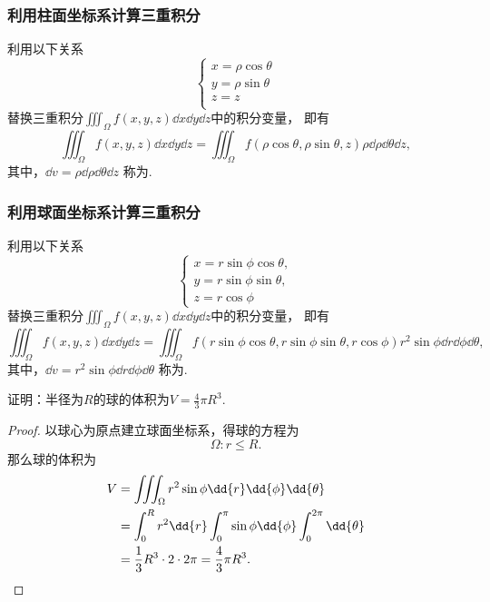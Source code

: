\subsubsection{利用柱面坐标系计算三重积分}
利用以下关系\begin{equation*}
	\left\{ \begin{array}{l}
		x = \rho\cos\theta \\
		y = \rho\sin\theta \\
		z = z \\
	\end{array} \right.
\end{equation*}替换三重积分\(\iiint_\Omega{f(x,y,z)\dd{x}\dd{y}\dd{z}}\)中的积分变量，
即有\begin{equation*}
	\iiint_\Omega{f(x,y,z)\dd{x}\dd{y}\dd{z}}
	= \iiint_\Omega{f(\rho \cos\theta,\rho \sin\theta,z) \rho \dd{\rho} \dd{\theta} \dd{z}},
\end{equation*}
其中，\(\dd{v} = \rho \dd{\rho} \dd{\theta} \dd{z}\)
称为.

\subsubsection{利用球面坐标系计算三重积分}
利用以下关系\begin{equation*}
	\left\{ \begin{array}{l}
		x = r \sin\phi \cos\theta, \\
		y = r \sin\phi \sin\theta, \\
		z = r \cos\phi
	\end{array} \right.
\end{equation*}替换三重积分\(\iiint_\Omega{f(x,y,z)\dd{x}\dd{y}\dd{z}}\)中的积分变量，
即有\begin{equation*}
	\iiint_\Omega{f(x,y,z)\dd{x}\dd{y}\dd{z}}
	= \iiint_\Omega{f(r \sin\phi \cos\theta,r \sin\phi \sin\theta,r \cos\phi) r^2 \sin\phi \dd{r} \dd{\phi} \dd{\theta}},
\end{equation*}
其中，\(\dd{v} = r^2 \sin\phi \dd{r} \dd{\phi} \dd{\theta}\)
称为.

\begin{example}
证明：半径为\(R\)的球的体积为\(V = \frac{4}{3} \pi R^3\).
\begin{proof}
以球心为原点建立球面坐标系，得球的方程为\begin{equation*}
	\Omega: r \leq R.
\end{equation*}
那么球的体积为\begin{align*}
	V &= \iiint_\Omega r^2 \sin\phi \dd{r} \dd{\phi} \dd{\theta} \\
	&= \int_0^R r^2 \dd{r} \int_0^\pi \sin\phi \dd{\phi} \int_0^{2\pi} \dd{\theta} \\
	&= \frac{1}{3} R^3 \cdot 2 \cdot 2\pi
	= \frac{4}{3} \pi R^3.
	\qedhere
\end{align*}
\end{proof}
\end{example}

